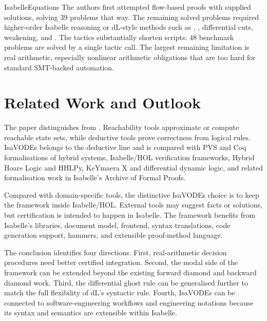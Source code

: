 \documentclass[hidelinks]{article}
\begin{document}
\begin{smodule}[title={IsaVODEs: Interactive Verification of Cyber-Physical Systems at Scale}]{IsabelleEquations}
The authors first attempted flow-based proofs with supplied solutions, solving \(39\) problems that way.
The remaining solved problems required higher-order Isabelle reasoning or dL-style methods such as , , differential cuts, weakening, and .
The tactics substantially shorten scripts: \(48\) benchmark problems are solved by a single tactic call.
The largest remaining limitation is real arithmetic, especially nonlinear arithmetic obligations that are too hard for standard SMT-backed automation.

\section{Related Work and Outlook}

The paper distinguishes  from .
Reachability tools approximate or compute reachable state sets, while deductive tools prove correctness from logical rules.
IsaVODEs belongs to the deductive line and is compared with PVS and Coq formalisations of hybrid systems, Isabelle/HOL verification frameworks, Hybrid Hoare Logic and HHLPy, KeYmaera X and differential dynamic logic, and related formalisation work in Isabelle's Archive of Formal Proofs.

Compared with domain-specific tools, the distinctive IsaVODEs choice is to keep the framework inside Isabelle/HOL.
External tools may suggest facts or solutions, but certification is intended to happen in Isabelle.
The framework benefits from Isabelle's libraries, document model, frontend, syntax translations, code generation support, hammers, and extensible proof-method language.

The conclusion identifies four directions.
First, real-arithmetic decision procedures need better certified integration.
Second, the modal side of the framework can be extended beyond the existing forward diamond and backward diamond work.
Third, the differential ghost rule can be generalised further to match the full flexibility of dL's syntactic rule.
Fourth, IsaVODEs can be connected to software-engineering workflows and engineering notations because its syntax and semantics are extensible within Isabelle.

\end{smodule}
\end{document}

